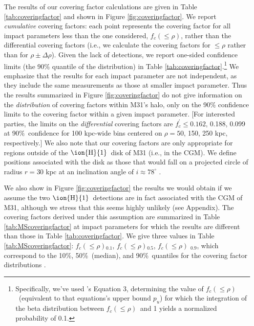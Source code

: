 \documentclass[12pt,preprint]{aastex6}
\newcommand{\HI}{\ensuremath{\mbox{\ion{H}{1}}}}
\newcommand{\fccum}{\ensuremath{f_c(\le \rho)}\relax}
\begin{document}
The results of our covering factor calculations are given in Table
\ref{tab:coveringfactor} and shown in Figure
\ref{fig:coveringfactor}. We report {\em cumulative} covering factors:
each point represents the covering factor for all impact parameters
less than the one considered, \fccum, rather than the differential
covering factors (i.e., we calculate the covering factors for
$\le \rho$ rather than for $\rho \pm \Delta \rho$). Given the lack of
detections, we report one-sided confidence limits (the 90\% quantile
of the distribution) in Table
\ref{tab:coveringfactor}.\footnote{Specifically, we've used
  \citeauthor{cameron2011}'s Equation 3, determining the value of
  \fccum\ (equivalent to that equations's upper bound $p_u$) for which
  the integration of the beta distribution between \fccum\ and 1
  yields a normalized probability of 0.1.} We emphasize that the
results for each impact parameter are not independent, as they include
the same measurements as those at smaller impact parameter. Thus the
results summarized in Figure \ref{fig:coveringfactor} do not give
information on the {\em distribution} of covering factors within M31's
halo, only on the 90\% confidence limits to the covering factor within
a given impact parameter. [For interested parties, the limits on the
{\em differential} covering factors are $f_c^\prime \le 0.162$, 0.188,
0.099 at 90\%\ confidence for 100 kpc-wide bins centered on
$\rho = 50$, 150, 250 kpc, respectively.] We also note that our
covering factors are only appropriate for regions outside of the \HI\
disk of M31 (i.e., in the CGM). We define positions associated with
the disk as those that would fall on a projected circle of radius
$r=30$ kpc at an inclination angle of $i\approx 78^\circ$
\citep{braun1991}.

We also show in Figure \ref{fig:coveringfactor} the results we would
obtain if we assume the two \HI\ detections are in fact associated
with the CGM of M31, although we stress that this seems highly
unlikely (see Appendix). The covering factors derived under this
assumption are summarized in Table \ref{tab:MScoveringfactor} at
impact parameters for which the results are different than those in
Table \ref{tab:coveringfactor}. We give three values in Table
\ref{tab:MScoveringfactor}: \fccum $_{0.1}$, \fccum $_{0.5}$, \fccum
$_{0.9}$, which correspond to the 10\%, 50\%\ (median), and 90\%\
quantiles for the covering factor distributions \citep[again using the
incomplete beta generator discussed by ][]{cameron2011}.
\end{document}
